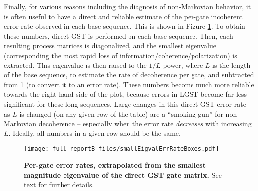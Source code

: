 {Finally, for various reasons including the diagnosis of non-Markovian behavior, it is often useful to have a direct and reliable estimate of the per-gate incoherent error rate observed in each base sequence.  This is shown in Figure \ref{smallEigvalErrRateColorBoxPlot}.  To obtain these numbers, direct GST is performed on each base sequence.  Then, each resulting process matrices is diagonalized, and the smallest eigenvalue (corresponding the most rapid loss of information/coherence/polarization) is extracted.  This eigenvalue is then raised to the $1/L$ power, where $L$ is the length of the base sequence, to estimate the rate of decoherence per gate, and subtracted from 1 (to convert it to an error rate).  These numbers become much more reliable towards the right-hand side of the plot, because errors in LGST become far less significant for these long sequences.  Large changes in this direct-GST error rate as $L$ is changed (on any given row of the table) are a ``smoking gun'' for non-Markovian decoherence -- especially when the error rate \emph{decreases} with increasing $L$.  Ideally, all numbers in a given row should be the same.

\begin{figure}
\begin{center}
\texttt{[image: full\_reportB\_files/smallEigvalErrRateBoxes.pdf]}
\caption{\textbf{Per-gate error rates, extrapolated from the smallest magnitude eigenvalue of the direct GST gate matrix.}  See text for further details.\label{smallEigvalErrRateColorBoxPlot}}
\end{center}
\end{figure}

}{}

